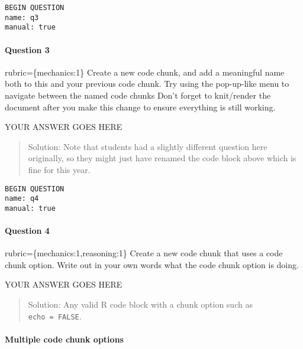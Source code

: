 \documentclass[
]{article}
\begin{document}
\begin{verbatim}
BEGIN QUESTION
name: q3
manual: true
\end{verbatim}

\begin{alert alert-info}
\hypertarget{question-3}{%
\paragraph{Question 3}\label{question-3}}

rubric=\{mechanics:1\} Create a new code chunk, and add a meaningful
name both to this and your previous code chunk. Try using the
pop-up-like menu to navigate between the named code chunks Don't forget
to knit/render the document after you make this change to ensure
everything is still working.
\end{alert alert-info}

YOUR ANSWER GOES HERE

\begin{quote}
Solution: Note that students had a slightly different question here
originally, so they might just have renamed the code block above which
is fine for this year.
\end{quote}

\begin{verbatim}
BEGIN QUESTION
name: q4
manual: true
\end{verbatim}

\begin{alert alert-info}
\hypertarget{question-4}{%
\paragraph{Question 4}\label{question-4}}

rubric=\{mechanics:1,reasoning:1\} Create a new code chunk that uses a
code chunk option. Write out in your own words what the code chunk
option is doing.
\end{alert alert-info}

YOUR ANSWER GOES HERE

\begin{quote}
Solution: Any valid R code block with a chunk option such as
\texttt{echo\ =\ FALSE}.
\end{quote}

\hypertarget{multiple-code-chunk-options}{%
\paragraph{Multiple code chunk
options}\label{multiple-code-chunk-options}}
\end{document}
